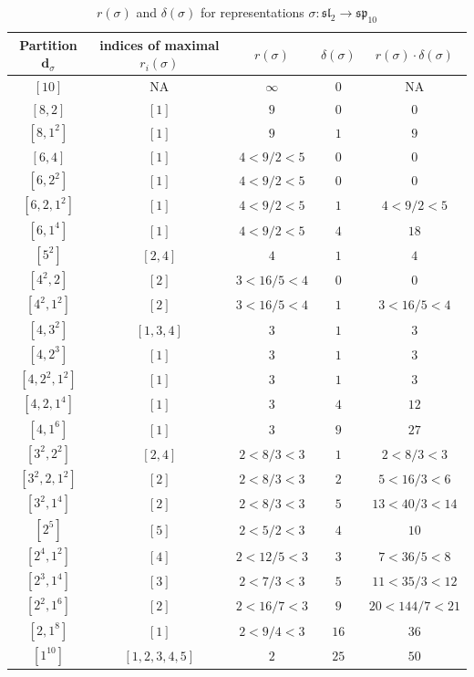 \documentclass{article}%
\begin{document}
    \begin{center}
    \label{table:sp_10}
    \begin{longtable}{||c|c|c|c|c||}
    \caption{$r(\sigma)$ and $\delta(\sigma)$ for representations $\sigma: \mathfrak{sl}_2 \to \mathfrak{sp}_{10}$}
    \hline
    Partition $\textbf{d}_\sigma$
    &indices of maximal $r_i(\sigma)$
    &$r(\sigma)$
    &$\delta(\sigma)$
    &$r(\sigma) \cdot \delta(\sigma)$
    \\ [0.3ex] \hline\endhead
    $[10]$ & NA & $\infty$ & $0$ & NA \\ \hline 
$[8, 2]$ & $[1]$ & $9$ & $0$ & $0$ \\ \hline 
$[8, 1^{2}]$ & $[1]$ & $9$ & $1$ & $9$ \\ \hline 
$[6, 4]$ & $[1]$ & $4 < 9/2 < 5$ & $0$ & $0$ \\ \hline 
$[6, 2^{2}]$ & $[1]$ & $4 < 9/2 < 5$ & $0$ & $0$ \\ \hline 
$[6, 2, 1^{2}]$ & $[1]$ & $4 < 9/2 < 5$ & $1$ & $4 < 9/2 < 5$ \\ \hline 
$[6, 1^{4}]$ & $[1]$ & $4 < 9/2 < 5$ & $4$ & $18$ \\ \hline 
$[5^{2}]$ & $[2, 4]$ & $4$ & $1$ & $4$ \\ \hline 
$[4^{2}, 2]$ & $[2]$ & $3 < 16/5 < 4$ & $0$ & $0$ \\ \hline 
$[4^{2}, 1^{2}]$ & $[2]$ & $3 < 16/5 < 4$ & $1$ & $3 < 16/5 < 4$ \\ \hline 
$[4, 3^{2}]$ & $[1, 3, 4]$ & $3$ & $1$ & $3$ \\ \hline 
$[4, 2^{3}]$ & $[1]$ & $3$ & $1$ & $3$ \\ \hline 
$[4, 2^{2}, 1^{2}]$ & $[1]$ & $3$ & $1$ & $3$ \\ \hline 
$[4, 2, 1^{4}]$ & $[1]$ & $3$ & $4$ & $12$ \\ \hline 
$[4, 1^{6}]$ & $[1]$ & $3$ & $9$ & $27$ \\ \hline 
$[3^{2}, 2^{2}]$ & $[2, 4]$ & $2 < 8/3 < 3$ & $1$ & $2 < 8/3 < 3$ \\ \hline 
$[3^{2}, 2, 1^{2}]$ & $[2]$ & $2 < 8/3 < 3$ & $2$ & $5 < 16/3 < 6$ \\ \hline 
$[3^{2}, 1^{4}]$ & $[2]$ & $2 < 8/3 < 3$ & $5$ & $13 < 40/3 < 14$ \\ \hline 
$[2^{5}]$ & $[5]$ & $2 < 5/2 < 3$ & $4$ & $10$ \\ \hline 
$[2^{4}, 1^{2}]$ & $[4]$ & $2 < 12/5 < 3$ & $3$ & $7 < 36/5 < 8$ \\ \hline 
$[2^{3}, 1^{4}]$ & $[3]$ & $2 < 7/3 < 3$ & $5$ & $11 < 35/3 < 12$ \\ \hline 
$[2^{2}, 1^{6}]$ & $[2]$ & $2 < 16/7 < 3$ & $9$ & $20 < 144/7 < 21$ \\ \hline 
$[2, 1^{8}]$ & $[1]$ & $2 < 9/4 < 3$ & $16$ & $36$ \\ \hline 
$[1^{10}]$ & $[1, 2, 3, 4, 5]$ & $2$ & $25$ & $50$ \\ \hline 
    \end{longtable}
    \end{center}
\newpage
\end{document}
